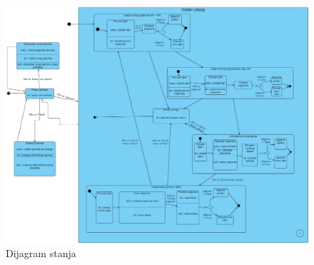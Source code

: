         \begin{figure}[H]
            \includegraphics[width=1.1\textwidth]{dijagrami/Dijagram_stanja.png} 
            \centering
            \caption{Dijagram stanja}
            \label{fig:class_diagram}
        \end{figure}			
			
			\eject 
		
